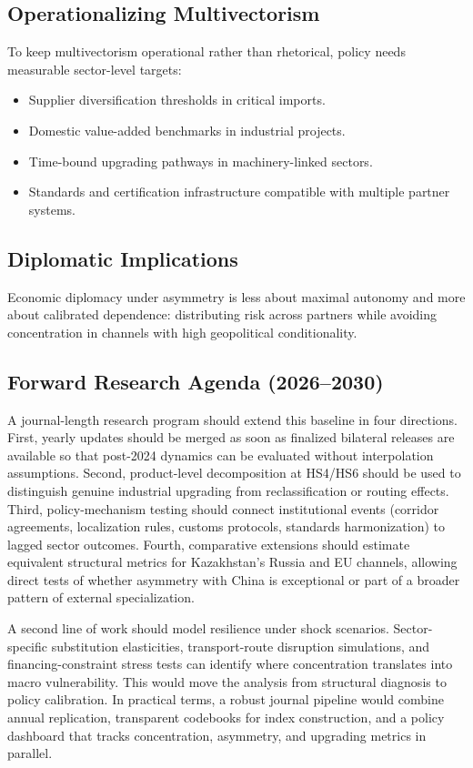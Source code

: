 \documentclass[12pt]{article}
\begin{document}
\subsection{Operationalizing Multivectorism}
To keep multivectorism operational rather than rhetorical, policy needs measurable sector-level targets:
\begin{itemize}
\item Supplier diversification thresholds in critical imports.
\item Domestic value-added benchmarks in industrial projects.
\item Time-bound upgrading pathways in machinery-linked sectors.
\item Standards and certification infrastructure compatible with multiple partner systems.
\end{itemize}

\subsection{Diplomatic Implications}
Economic diplomacy under asymmetry is less about maximal autonomy and more about calibrated dependence: distributing risk across partners while avoiding concentration in channels with high geopolitical conditionality.


\subsection{Forward Research Agenda (2026--2030)}
A journal-length research program should extend this baseline in four directions. First, yearly updates should be merged as soon as finalized bilateral releases are available so that post-2024 dynamics can be evaluated without interpolation assumptions. Second, product-level decomposition at HS4/HS6 should be used to distinguish genuine industrial upgrading from reclassification or routing effects. Third, policy-mechanism testing should connect institutional events (corridor agreements, localization rules, customs protocols, standards harmonization) to lagged sector outcomes. Fourth, comparative extensions should estimate equivalent structural metrics for Kazakhstan's Russia and EU channels, allowing direct tests of whether asymmetry with China is exceptional or part of a broader pattern of external specialization.

A second line of work should model resilience under shock scenarios. Sector-specific substitution elasticities, transport-route disruption simulations, and financing-constraint stress tests can identify where concentration translates into macro vulnerability. This would move the analysis from structural diagnosis to policy calibration. In practical terms, a robust journal pipeline would combine annual replication, transparent codebooks for index construction, and a policy dashboard that tracks concentration, asymmetry, and upgrading metrics in parallel.
\end{document}
